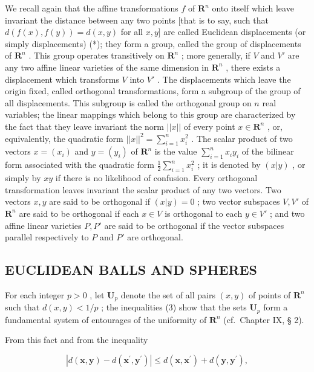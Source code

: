 We recall again that the affine transformations \(f\) of \(\mathbf{R}^n\) onto itself which leave invariant the distance between any two points {[}that is to say, such that \(d(f(x), f(y)) = d(x, y)\) for all \(x, y]\) are called Euclidean displacements (or simply displacements) (*); they form a group, called the group of displacements of \(\mathbf{R}^n\) . This group operates transitively on \(\mathbf{R}^n\) ; more generally, if \(V\) and \(V'\) are any two affine linear varieties of the same dimension in \(\mathbf{R}^n\) , there exists a displacement which transforms \(V\) into \(V'\) . The displacements which leave the origin fixed, called orthogonal transformations, form a subgroup of the group of all displacements. This subgroup is called the orthogonal group on \(n\) real variables; the linear mappings which belong to this group are characterized by the fact that they leave invariant the norm \(||x||\) of every point \(x \in \mathbf{R}^n\) , or, equivalently, the quadratic form \(||x||^2 = \sum_{i=1}^{n} x_i^2\) . The scalar product of two vectors \(x = (x_i)\) and \(y = (y_i)\) of \(\mathbf{R}^n\) is the value \(\sum_{i=1}^{n} x_i y_i\) of the bilinear form associated with the quadratic form \(\frac{1}{2} \sum_{i=1}^{n} x_i^2\) ; it is denoted by \((x|y)\) , or simply by \(xy\) if there is no likelihood of confusion. Every orthogonal transformation leaves invariant the scalar product of any two vectors. Two vectors \(x, y\) are said to be orthogonal if \((x|y) = 0\) ; two vector subspaces \(V, V'\) of \(\mathbf{R}^n\) are said to be orthogonal if each \(x \in V\) is orthogonal to each \(y \in V'\) ; and two affine linear varieties \(P, P'\) are said to be orthogonal if the vector subspaces parallel respectively to \(P\) and \(P'\) are orthogonal.

\subsection{EUCLIDEAN BALLS AND SPHERES}

For each integer \(p > 0\) , let \(\mathbf{U}_p\) denote the set of all pairs \((x, y)\) of points of \(\mathbf{R}^n\) such that \(d(x, y) < 1/p\) ; the inequalities (3) show that the sets \(\mathbf{U}_p\) form a fundamental system of entourages of the uniformity of \(\mathbf{R}^n\) (cf.~Chapter IX, § 2).

From this fact and from the inequality

\[
\left| d \left(\boldsymbol {x}, \boldsymbol {y}\right) - d \left(\boldsymbol {x} ^ {\prime}, \boldsymbol {y} ^ {\prime}\right) \right| \leqslant d \left(\boldsymbol {x}, \boldsymbol {x} ^ {\prime}\right) + d \left(\boldsymbol {y}, \boldsymbol {y} ^ {\prime}\right),
\]

